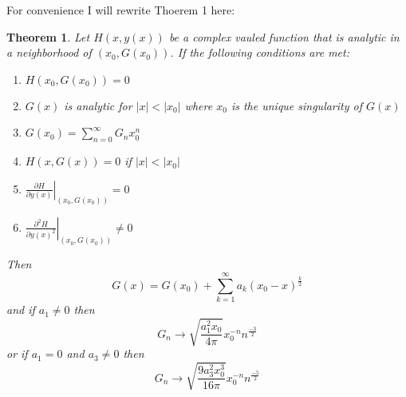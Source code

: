 \documentclass{article}
\begin{document}
For convenience I will rewrite Thoerem 1 here:
\newtheorem{theorem}{Theorem}
\begin{theorem}
Let \(H(x,y(x))\) be a complex vauled function that is analytic in a neighborhood of \((x_0,G(x_0))\). If the following conditions are met:
\begin{enumerate}
\item \(H(x_0,G(x_0))=0\)
\item \(G(x)\) is analytic for \(|x|<|x_0|\) where \(x_0\) is the unique singularity of \(G(x)\)
\item \(G(x_0)=\sum_{n=0}^\infty G_nx_0^n\)
\item \(H(x,G(x))=0\) if \(|x|<|x_0|\)
\item \(\left.\frac{\partial H}{\partial {y(x)}}\right|_{(x_0,G(x_0))} = 0\)
\item \(\left.\frac{\partial^2 H}{\partial {y(x)}^2}\right|_{(x_0,G(x_0))} \neq 0\)
\end{enumerate}
Then
\[G(x)=G(x_0) + \sum_{k=1}^\infty a_k(x_0-x)^{\frac{k}{2}}\]
and if \(a_1 \neq 0\) then 
\[G_n \to \sqrt{ \frac{a_1^2x_0}{4\pi}}x_0^{-n}n^{\frac{-3}{2}}\]
or if \(a_1=0\) and \(a_3 \neq 0\) then 
\[G_n \to \sqrt{\frac{9a_3^2x_0^3}{16\pi}}x_0^{-n}n^{\frac{-5}{2}}\]
\end{theorem}
\end{document}
